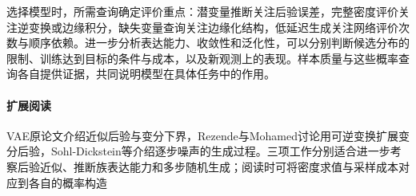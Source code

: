 选择模型时，所需查询确定评价重点：潜变量推断关注后验误差，完整密度评价关注逆变换或边缘积分，缺失变量查询关注边缘化结构，低延迟生成关注网络评价次数与顺序依赖。进一步分析表达能力、收敛性和泛化性，可以分别判断候选分布的限制、训练达到目标的条件与成本，以及新观测上的表现。样本质量与这些概率查询各自提供证据，共同说明模型在具体任务中的作用。

\paragraph{扩展阅读}
VAE原论文介绍近似后验与变分下界，Rezende与Mohamed讨论用可逆变换扩展变分后验，Sohl-Dickstein等介绍逐步噪声的生成过程。三项工作分别适合进一步考察后验近似、推断族表达能力和多步随机生成；阅读时可将密度求值与采样成本对应到各自的概率构造
